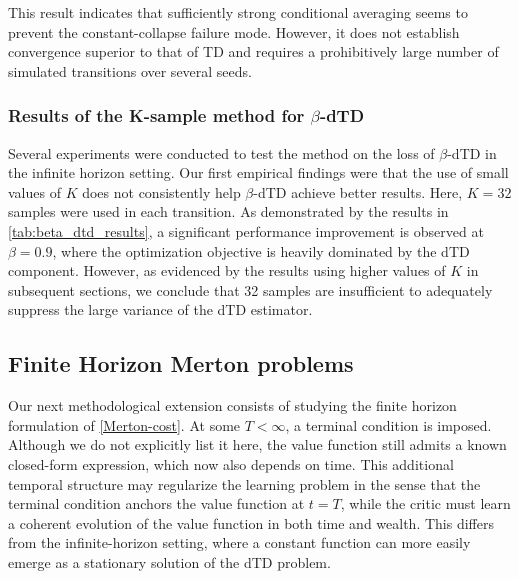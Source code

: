 \documentclass{article}
\begin{document}
This result indicates that sufficiently strong conditional averaging seems to prevent the constant-collapse failure mode. However, it does not establish convergence superior to that of TD and requires a prohibitively large number of simulated transitions over several seeds.

\subsubsection{Results of the K-sample method for \texorpdfstring{$\beta$}{beta}-dTD}

Several experiments were conducted to test the method on the loss of $\beta$-dTD in the infinite horizon setting. Our first empirical findings were that the use of small values of $K$ does not consistently help $\beta$-dTD achieve better results. Here, $K=32$ samples were used in each transition. As demonstrated by the results in \cref{tab:beta_dtd_results}, a significant performance improvement is observed at $\beta=0.9$, where the optimization objective is heavily dominated by the dTD component. However, as evidenced by the results using higher values of $K$ in subsequent sections, we conclude that 32 samples are insufficient to adequately suppress the large variance of the dTD estimator.

\subsection{Finite Horizon Merton problems}
Our next methodological extension consists of studying the finite horizon formulation of \cref{Merton-cost}. At some $T<\infty$, a terminal condition is imposed. Although we do not explicitly list it here, the value function still admits a known closed-form expression, which now also depends on time. This additional temporal structure may regularize the learning problem in the sense that the terminal condition anchors the value function at $t=T$, while the critic must learn a coherent evolution of the value function in both time and wealth. This differs from the infinite-horizon setting, where a constant function can more easily emerge as a stationary solution of the dTD problem.
\end{document}
